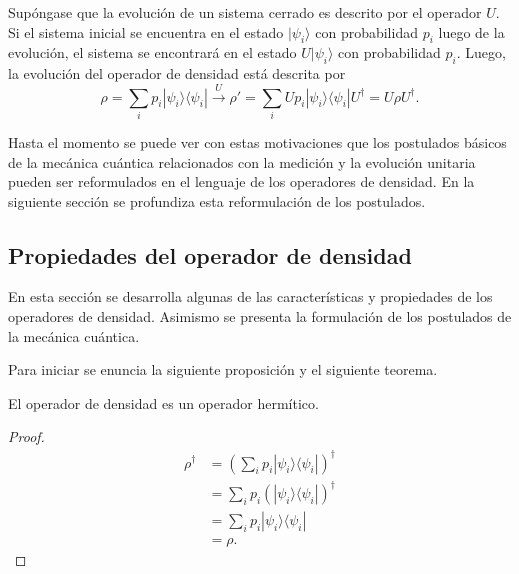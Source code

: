Supóngase que la evolución de un sistema cerrado es descrito por el operador
$U$. Si el sistema inicial se encuentra en el estado $|\psi_i\rangle$ con
probabilidad $p_i$ luego de la evolución, el sistema se encontrará en el estado
$U|\psi_i\rangle$ con probabilidad $p_i$. Luego, la evolución del operador de
densidad está descrita por
{\cite{nielsen_chuang_2010}}\[\rho=\sum_{i}p_i|\psi_i\rangle \langle
\psi_i|\xrightarrow{U}\rho'=\sum_{i}Up_i|\psi_i\rangle \langle
\psi_i|U^{\dagger}=U\rho U^{\dagger}.\]


Hasta el momento se puede ver con estas motivaciones que los postulados básicos
de la mecánica cuántica relacionados con la medición y la evolución unitaria
pueden ser reformulados en el lenguaje de los operadores de densidad. En la
siguiente sección se profundiza esta reformulación de los postulados.


\subsection{Propiedades del operador de densidad}\label{subsec:postulates} %

En esta sección se desarrolla algunas de las características y propiedades de
los operadores de densidad. Asimismo se presenta la formulación de los
postulados de la mecánica cuántica. 

Para iniciar se enuncia la siguiente proposición y el siguiente teorema. 

\begin{proposition}El operador de densidad es un operador hermítico.  \end{proposition}


\begin{proof}
	\begin{equation}
		\begin{split}
			\rho^\dagger&={\left(\sum_{i} p_i|\psi_i\rangle \langle \psi_i|\right)}^{\dagger}\\
			&=\sum_{i} p_i {\left(|\psi_i\rangle \langle\psi_i|\right)}^{\dagger}\\
			&=\sum_{i} p_i |\psi_i\rangle \langle\psi_i|\\
			&=\rho.
		\end{split}
	\end{equation}
	
\end{proof}

